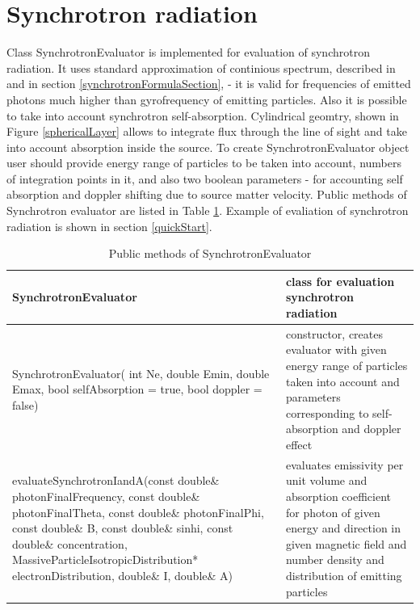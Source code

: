 \section{Synchrotron radiation}\label{synchrotronSection}
Class SynchrotronEvaluator is implemented for evaluation of synchrotron radiation. It uses standard approximation of continious spectrum, described in \cite{Ginzburg1975, Ghisellini} and in section \ref{synchrotronFormulaSection},  - it is valid for frequencies of emitted photons much higher than gyrofrequency of emitting particles. Also it is possible to take into account synchrotron self-absorption. Cylindrical geomtry, shown in Figure \ref{sphericalLayer} allows to integrate flux through the line of sight and take into account absorption inside the source. To create SynchrotronEvaluator object user should provide energy range of particles to be taken into account, numbers of integration points in it, and also two boolean parameters - for accounting self absorption and doppler shifting due to source matter velocity. Public methods of Synchrotron evaluator are listed in Table  \ref{SynchrotronEvaluator}. Example of evaliation of synchrotron radiation is shown in section \ref{quickStart}.
\begin{table}[h]
	\begin{center}
	\begin{small}
	\caption{Public methods of SynchrotronEvaluator}
	\label{SynchrotronEvaluator}
	\begin{tabularx}{\textwidth}{|X|X|} 
		\hline
		\textbf{SynchrotronEvaluator} & class for evaluation synchrotron radiation\\
		\hline
		SynchrotronEvaluator( int Ne, double Emin, double Emax, bool selfAbsorption = true, bool doppler = false) & constructor, creates evaluator with given energy range of particles taken into account and parameters corresponding to self-absorption and doppler effect\\
		\hline
		evaluateSynchrotronIandA(const double\& photonFinalFrequency, const double\& photonFinalTheta, const double\& photonFinalPhi, const double\& B, const double\& sinhi, const double\& concentration, MassiveParticleIsotropicDistribution* electronDistribution, double\& I, double\& A) & evaluates emissivity per unit volume and absorption coefficient for photon of given energy and direction in given magnetic field and number density and distribution of emitting particles\\
		\hline
	\end{tabularx}
\end{small}
\end{center}
\end{table}
